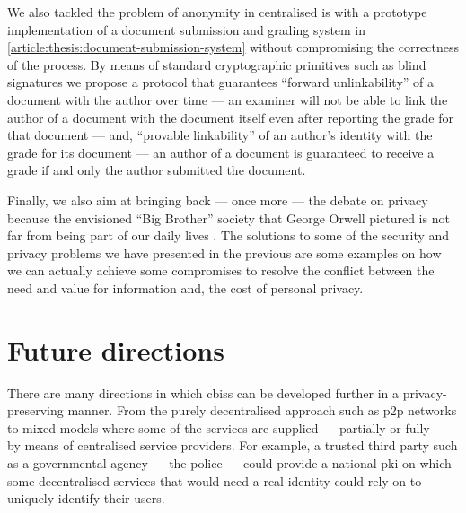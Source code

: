 We also tackled the problem of anonymity in centralised \ac{is} with a prototype 
implementation of a document submission and grading system in \cref{article:thesis:document-submission-system} 
without compromising the correctness of the process. By means of standard cryptographic 
primitives such as blind signatures we propose a protocol that guarantees ``forward 
unlinkability'' of a document with the author over time --- an examiner will not 
be able to link the author of a document with the document itself even after reporting 
the grade for that document --- and, ``provable linkability'' of an author's identity 
with the grade for its document --- an author of a document is guaranteed to receive 
a grade if and only the author submitted the document.

Finally, we also aim at bringing back --- once more --- the debate on privacy because 
the envisioned ``Big Brother'' society that George Orwell pictured is not far from 
being part of our daily lives \cite{Orwell49}. The solutions to some of the security 
and privacy problems we have presented in the previous  
are some examples on how we can actually achieve some compromises to resolve the 
conflict between the need and value for information and, the cost of personal privacy.

\section{Future directions}
    \label{section:future-directions}
There are many directions in which \acp{cbis} can be developed further in a privacy-preserving 
manner. From the purely decentralised approach such as \ac{p2p} networks to mixed 
models where some of the services are supplied --- partially or fully ---- by means 
of centralised service providers. For example, a trusted third party such as a governmental 
agency --- the police --- could provide a national \ac{pki} on which some decentralised
services that would need a real identity could rely on to uniquely identify their 
users.

